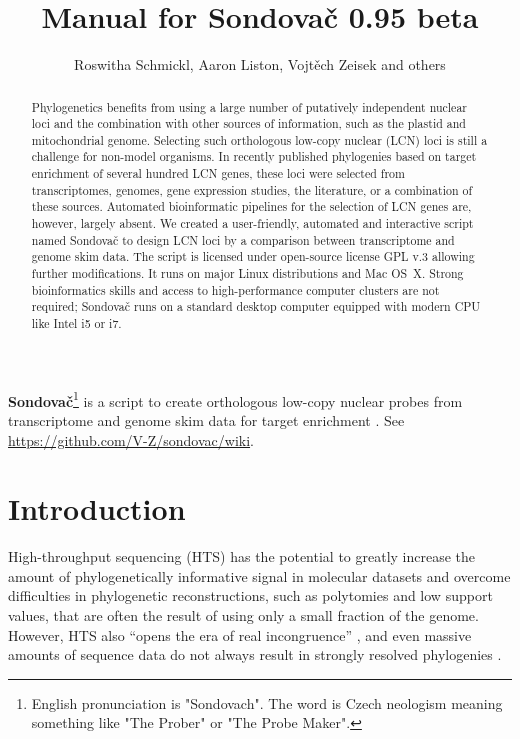 \documentclass[a4paper, 11pt, twoside]{article}
\title{Manual for Sondovač 0.95 beta}
\author{Roswitha Schmickl, Aaron Liston, Vojtěch Zeisek and others}
\begin{document}
\maketitle
\textbf{Sondovač}\footnote{English pronunciation is "Sondovach". The word is Czech neologism meaning something like "The Prober" or "The Probe Maker".} is a script to create orthologous low-copy nuclear probes from transcriptome and genome skim data for target enrichment \citep{Schmickl2016}. See \href{https://github.com/V-Z/sondovac/wiki}{https://github.com/V-Z/sondovac/wiki}.

\begin{abstract}
Phylogenetics benefits from using a large number of putatively independent nuclear loci and the combination with other sources of information, such as the plastid and mitochondrial genome. Selecting such orthologous low-copy nuclear (LCN) loci is still a challenge for non-model organisms. In recently published phylogenies based on target enrichment of several hundred LCN genes, these loci were selected from transcriptomes, genomes, gene expression studies, the literature, or a combination of these sources. Automated bioinformatic pipelines for the selection of LCN genes are, however, largely absent. We created a user-friendly, automated and interactive script named Sondovač to design LCN loci by a comparison between transcriptome and genome skim data. The script is licensed under open-source license GPL v.3 allowing further modifications. It runs on major Linux distributions and Mac OS~X. Strong bioinformatics skills and access to high-performance computer clusters are not required; Sondovač runs on a standard desktop computer equipped with modern CPU like Intel i5 or i7.
\end{abstract}

\tableofcontents
\listoffigures
\listoftables
\vskip 1cm



\section{Introduction}

High-throughput sequencing (HTS) has the potential to greatly increase the amount of phylogenetically informative signal in molecular datasets \citep{Parks2009, Parks2012} and overcome difficulties in phylogenetic reconstructions, such as polytomies and low support values, that are often the result of using only a small fraction of the genome. However, HTS also “opens the era of real incongruence” \citep{Jeffroy2006}, and even massive amounts of sequence data do not always result in strongly resolved phylogenies \citep{Pyron2015}.
\end{document}
